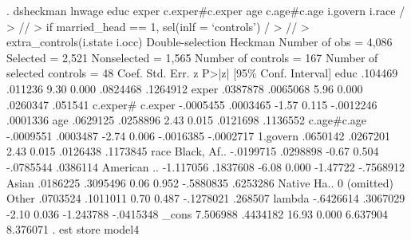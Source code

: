 . dsheckman lnwage educ exper c.exper\#c.exper age c.age\#c.age i.govern i.race /
> //
>         if married_head == 1, sel(inlf = `controls')                        /
> //
>         extra_controls(i.state i.occ)
{\smallskip}
Double-selection Heckman              Number of obs               =      4,086
                                      Selected                    =      2,521
                                      Nonselected                 =      1,565
                                      Number of controls          =        167
                                      Number of selected controls =         48
{\smallskip}
             {\VBAR}      Coef.   Std. Err.      z    P>|z|     [95\% Conf. Interval]
        educ {\VBAR}    .104469    .011236     9.30   0.000     .0824468    .1264912
       exper {\VBAR}   .0387878   .0065068     5.96   0.000     .0260347     .051541
             {\VBAR}
     c.exper\#{\VBAR}
     c.exper {\VBAR}  -.0005455   .0003465    -1.57   0.115    -.0012246    .0001336
             {\VBAR}
         age {\VBAR}   .0629125   .0258896     2.43   0.015     .0121698    .1136552
             {\VBAR}
 c.age\#c.age {\VBAR}  -.0009551   .0003487    -2.74   0.006    -.0016385   -.0002717
             {\VBAR}
    1.govern {\VBAR}   .0650142   .0267201     2.43   0.015     .0126438    .1173845
             {\VBAR}
        race {\VBAR}
Black, Af..  {\VBAR}  -.0199715   .0298898    -0.67   0.504    -.0785544    .0386114
American ..  {\VBAR}  -1.117056   .1837608    -6.08   0.000     -1.47722   -.7568912
      Asian  {\VBAR}   .0186225   .3095496     0.06   0.952    -.5880835    .6253286
Native Ha..  {\VBAR}          0  (omitted)
      Other  {\VBAR}   .0703524   .1011011     0.70   0.487    -.1278021     .268507
             {\VBAR}
      lambda {\VBAR}  -.6426614   .3067029    -2.10   0.036    -1.243788   -.0415348
       _cons {\VBAR}   7.506988   .4434182    16.93   0.000     6.637904    8.376071
{\smallskip}
. est store model4
{\smallskip}
